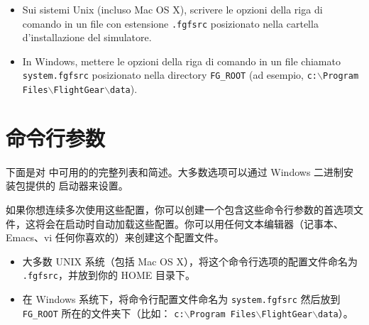 \begin{itemize}
{  \begin{itemize}
  \item Sui sistemi Unix (incluso Mac OS X), scrivere le opzioni della riga di comando in
  un file con estensione \texttt{.fgfsrc} posizionato nella cartella d'installazione
  del simulatore.

  \item In Windows, mettere le opzioni della riga di comando in un file chiamato
  \texttt{system.fgfsrc}
   posizionato nella directory \texttt{FG\_ROOT}
  (ad esempio, \texttt{c:$\backslash$Program Files$\backslash$FlightGear$\backslash$data}).
  \end{itemize}

}

\ifchinese
{
  \section{命令行参数\label{options}}
 下面是对 \FlightGear{} 中可用的的完整列表和简述。大多数选项可以通过 Windows 二进制安装包提供的 \FlightGear{} 启动器来设置。

 如果你想连续多次使用这些配置，你可以创建一个包含这些命令行参数的首选项文件，这将会在启动时自动加载这些配置。你可以用任何文本编辑器（记事本、Emacs、vi 任何你喜欢的）来创建这个配置文件。

 \begin{itemize}
  \item 大多数 UNIX 系统（包括 Mac OS X），将这个命令行选项的配置文件命名为 \texttt{.fgfsrc}，并放到你的 HOME 目录下。

  \item 在 Windows 系统下，将命令行配置文件命名为 \texttt{system.fgfsrc} 然后放到 \texttt{FG\_ROOT} 所在的文件夹下（比如： \texttt{c:$\backslash$Program Files$\backslash$FlightGear$\backslash$data}）。
  \end{itemize}
}
\fi




\end{itemize}
